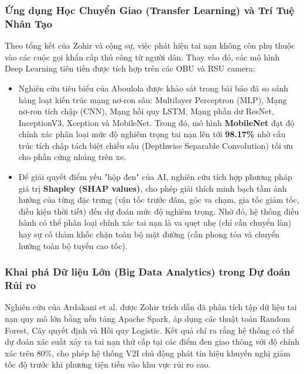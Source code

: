 \documentclass[a4paper]{article}
\begin{document}
\subsubsection{Ứng dụng Học Chuyển Giao (Transfer Learning) và Trí Tuệ Nhân Tạo}
Theo tổng kết của Zohir và cộng sự, việc phát hiện tai nạn không còn phụ thuộc vào các cuộc gọi khẩn cấp thủ công từ người dân. Thay vào đó, các mô hình Deep Learning tiên tiến được tích hợp trên các OBU và RSU camera:
\begin{itemize}
    \item Nghiên cứu tiêu biểu của Aboulola được khảo sát trong bài báo đã so sánh hàng loạt kiến trúc mạng nơ-ron sâu: Multilayer Perceptron (MLP), Mạng nơ-ron tích chập (CNN), Mạng hồi quy LSTM, Mạng phần dư ResNet, InceptionV3, Xception và MobileNet. Trong đó, mô hình \textbf{MobileNet} đạt độ chính xác phân loại mức độ nghiêm trọng tai nạn lên tới \textbf{98.17\%} nhờ cấu trúc tích chập tách biệt chiều sâu (Depthwise Separable Convolution) tối ưu cho phần cứng nhúng trên xe.
    \item Để giải quyết điểm yếu "hộp đen" của AI, nghiên cứu tích hợp phương pháp giá trị \textbf{Shapley (SHAP values)}, cho phép giải thích minh bạch tầm ảnh hưởng của từng đặc trưng (vận tốc trước đâm, góc va chạm, gia tốc giảm tốc, điều kiện thời tiết) đến dự đoán mức độ nghiêm trọng. Nhờ đó, hệ thống điều hành có thể phân loại chính xác tai nạn là va quẹt nhẹ (chỉ cần chuyển làn) hay sự cố thảm khốc chặn toàn bộ mặt đường (cần phong tỏa và chuyển hướng toàn bộ tuyến cao tốc).
\end{itemize}

\subsubsection{Khai phá Dữ liệu Lớn (Big Data Analytics) trong Dự đoán Rủi ro}
Nghiên cứu của Ardakani et al. được Zohir trích dẫn đã phân tích tập dữ liệu tai nạn quy mô lớn bằng nền tảng Apache Spark, áp dụng các thuật toán Random Forest, Cây quyết định và Hồi quy Logistic. Kết quả chỉ ra rằng hệ thống có thể dự đoán xác suất xảy ra tai nạn thứ cấp tại các điểm đen giao thông với độ chính xác trên 80\%, cho phép hệ thống V2I chủ động phát tín hiệu khuyến nghị giảm tốc độ trước khi phương tiện tiến vào khu vực rủi ro cao.
\end{document}
